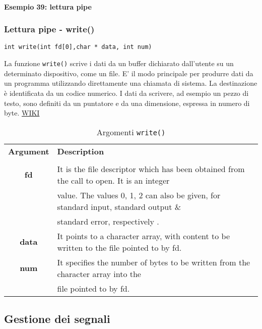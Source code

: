     \paragraph{Esempio 39: lettura pipe}\hfill \break
    
    
    \subsubsection{Lettura pipe - write()}
       
    \texttt{int write(int fd[0],char * data, int num)}
    
    La funzione \texttt{write()} scrive i dati da un buffer dichiarato dall'utente su un determinato dispositivo, come un file. E' il modo principale per produrre dati da un programma utilizzando direttamente una chiamata di sistema. La destinazione è identificata da un codice numerico. I dati da scrivere, ad esempio un pezzo di testo, sono definiti da un puntatore e da una dimensione, espressa in numero di byte. \href{https://en.wikipedia.org/wiki/Write_(system_call)}{WIKI}
    
    \begin{table}[ht]
    \centering
    \begin{tabular}{c|l}\textbf{}
    \textbf{Argument} &	\textbf{Description} \\ \\
    \textbf{fd} & It is the file descriptor which has been obtained from the call to open. It is an integer \\ 
     & value. The values 0, 1, 2 can also be given, for standard input, standard output $\&$ \\ 
     & standard error, respectively . \\
    \textbf{data} & It points to a character array, with content to be written to the file pointed to by fd. \\
    \textbf{num} & It specifies the number of bytes to be written from the character array into the \\
     & file pointed to by fd.\\ 
\end{tabular}
    \caption{Argomenti \texttt{write()}}
    \label{tab:tab3}
\end{table}
\subsection{Gestione dei segnali}
    
